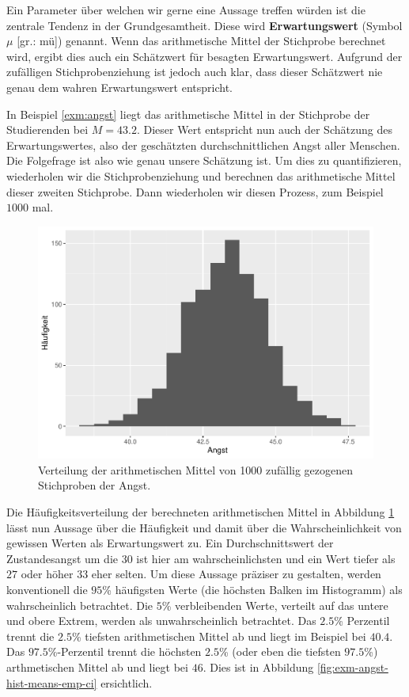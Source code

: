 \documentclass[
]{book}
\theoremstyle{definition}
\theoremstyle{definition}
\theoremstyle{definition}
\theoremstyle{definition}
\theoremstyle{remark}
\begin{document}
Ein Parameter über welchen wir gerne eine Aussage treffen würden ist die zentrale Tendenz in der Grundgesamtheit. \label{customdef-erwartungswert}{Diese wird \textbf{Erwartungswert} (Symbol \(\mu\) {[}gr.: mü{]}) genannt.} Wenn das arithmetische Mittel der Stichprobe berechnet wird, ergibt dies auch ein Schätzwert für besagten Erwartungswert. Aufgrund der zufälligen Stichprobenziehung ist jedoch auch klar, dass dieser Schätzwert nie genau dem wahren Erwartungswert entspricht.

In Beispiel \ref{exm:angst} liegt das arithmetische Mittel in der Stichprobe der Studierenden bei \(M=43.2\). Dieser Wert entspricht nun auch der Schätzung des Erwartungswertes, also der geschätzten durchschnittlichen Angst aller Menschen. Die Folgefrage ist also wie genau unsere Schätzung ist. Um dies zu quantifizieren, wiederholen wir die Stichprobenziehung und berechnen das arithmetische Mittel dieser zweiten Stichprobe. Dann wiederholen wir diesen Prozess, zum Beispiel \(1000\) mal.

\begin{figure}
\centering
\includegraphics{aps_statistik1_files/figure-latex/exm-angst-hist-means-1.pdf}
\caption{\label{fig:exm-angst-hist-means}Verteilung der arithmetischen Mittel von 1000 zufällig gezogenen Stichproben der Angst.}
\end{figure}

Die Häufigkeitsverteilung der berechneten arithmetischen Mittel in Abbildung \ref{fig:exm-angst-hist-means} lässt nun Aussage über die Häufigkeit und damit über die Wahrscheinlichkeit von gewissen Werten als Erwartungswert zu. Ein Durchschnittswert der Zustandesangst um die 30 ist hier am wahrscheinlichsten und ein Wert tiefer als \(27\) oder höher \(33\) eher selten. Um diese Aussage präziser zu gestalten, werden konventionell die \(95\)\% häufigsten Werte (die höchsten Balken im Histogramm) als wahrscheinlich betrachtet. Die \(5\)\% verbleibenden Werte, verteilt auf das untere und obere Extrem, werden als unwahrscheinlich betrachtet. Das \(2.5\)\% Perzentil trennt die \(2.5\)\% tiefsten arithmetischen Mittel ab und liegt im Beispiel bei \(40.4\). Das \(97.5\)\%-Perzentil trennt die höchsten \(2.5\)\% (oder eben die tiefsten \(97.5\)\%) arthmetischen Mittel ab und liegt bei \(46\). Dies ist in Abbildung \ref{fig:exm-angst-hist-means-emp-ci} ersichtlich.
\end{document}
